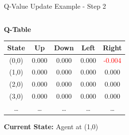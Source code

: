 \documentclass[aspectratio=169]{beamer}
\begin{document}
\begin{frame}{Q-Value Update Example - Step 2}
    
    \begin{columns}
        \begin{column}{0.45\textwidth}
            \textbf{Q-Table}
            \small
            \begin{table}[h]
                \centering
                \begin{tabular}{|c|c|c|c|c|}
                    \hline
                    \textbf{State} & \textbf{Up} & \textbf{Down} & \textbf{Left} & \textbf{Right} \\
                    \hline
                    (0,0) & 0.000 & 0.000 & 0.000 & \textcolor{red}{-0.004} \\
                    (1,0) & 0.000 & 0.000 & 0.000 & 0.000 \\
                    (2,0) & 0.000 & 0.000 & 0.000 & 0.000 \\
                    (3,0) & 0.000 & 0.000 & 0.000 & 0.000 \\
                    \dots & \dots & \dots & \dots & \dots \\
                    \hline
                \end{tabular}
            \end{table}
            
            \textbf{Current State:} Agent at (1,0)
            
            \vspace{0.3cm}
        \end{column}
        

\end{columns}
\end{frame}
\end{document}
